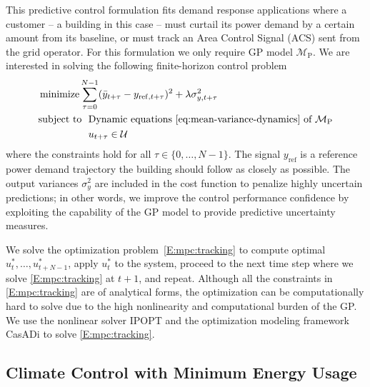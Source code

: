 This predictive control formulation fits demand response applications where a customer -- a building in this case -- must curtail its power demand by a certain amount from its baseline, or must track an Area Control Signal (ACS) sent from the grid operator.
For this formulation we only require GP model \(\mathcal{M}_{\mathrm{P}}\).
We are interested in solving the following finite-horizon control problem
\begin{align}
  &\operatorname*{minimize} \sum_{\tau=0}^{N-1} (\bar{y}_{t+\tau} - y_{\mathrm{ref},t+\tau})^2 + \lambda \sigma^2_{y,t+\tau} \label{E:mpc:tracking} \\
  & 
    \begin{aligned}
      \text{subject to}\ \  & \text{Dynamic equations \eqref{eq:mean-variance-dynamics} of $\mathcal{M}_{\mathrm{P}}$} \\
      & u_{t+\tau} \in \mathcal{U} \nonumber 
    \end{aligned}
\end{align}
where the constraints hold for all \(\tau \in \{0,\dots,N-1\}\).
The signal $y_{\mathrm{ref}}$ is a reference power demand trajectory the building should follow as closely as possible.
The output variances $\sigma^{2}_{y}$ are included in the cost function to penalize highly uncertain predictions; in other words, we improve the control performance confidence by exploiting the capability of the GP model to provide predictive uncertainty measures.

We solve the optimization problem~\eqref{E:mpc:tracking} to compute optimal \(u_{t}^*, \dots, u_{t+N-1}^*\), apply \(u_{t}^*\) to the system, proceed to the next time step where we solve \eqref{E:mpc:tracking} at \(t+1\), and repeat.
Although all the constraints in \eqref{E:mpc:tracking} are of analytical forms, the optimization can be computationally hard to solve due to the high nonlinearity and computational burden of the GP.
We use the nonlinear solver IPOPT \cite{Waechter2009b} and the optimization modeling framework CasADi \cite{Andersson2013b} to solve \eqref{E:mpc:tracking}.

\subsection{Climate Control with Minimum Energy Usage}


